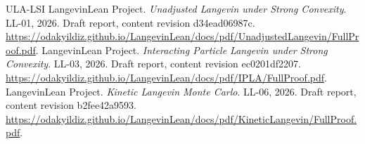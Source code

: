\documentclass[11pt,a4paper]{report}
\begin{document}
\begin{thebibliography}{ULA-LSI}
LangevinLean Project. \emph{Unadjusted Langevin under Strong Convexity}. LL-01, 2026. Draft report, content revision d34ead06987c. \url{https://odakyildiz.github.io/LangevinLean/docs/pdf/UnadjustedLangevin/FullProof.pdf}.
LangevinLean Project. \emph{Interacting Particle Langevin under Strong Convexity}. LL-03, 2026. Draft report, content revision ec0201df2207. \url{https://odakyildiz.github.io/LangevinLean/docs/pdf/IPLA/FullProof.pdf}.
LangevinLean Project. \emph{Kinetic Langevin Monte Carlo}. LL-06, 2026. Draft report, content revision b2fee42a9593. \url{https://odakyildiz.github.io/LangevinLean/docs/pdf/KineticLangevin/FullProof.pdf}.
\end{thebibliography}
\end{document}
